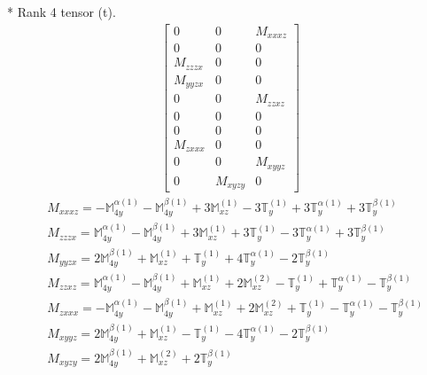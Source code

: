 \documentclass[fleqn,8pt,landscape]{jsarticle}
\begin{document}
* Rank 4 tensor (t).
\begin{align*}
\begin{bmatrix} 0 & 0 & M_{xxxz} \\ 0 & 0 & 0 \\ M_{zzzx} & 0 & 0 \\ M_{yyzx} & 0 & 0 \\ 0 & 0 & M_{zzxz} \\ 0 & 0 & 0 \\ 0 & 0 & 0 \\ M_{zxxx} & 0 & 0 \\ 0 & 0 & M_{xyyz} \\ 0 & M_{xyzy} & 0 \end{bmatrix}
\end{align*}
\begin{align*}
& M_{xxxz} = - \mathbb{M}_{4y}^{\alpha(1)} - \mathbb{M}_{4y}^{\beta(1)} + 3 \mathbb{M}_{xz}^{(1)} - 3 \mathbb{T}_{y}^{(1)} + 3 \mathbb{T}_{y}^{\alpha(1)} + 3 \mathbb{T}_{y}^{\beta(1)} \\
& M_{zzzx} = \mathbb{M}_{4y}^{\alpha(1)} - \mathbb{M}_{4y}^{\beta(1)} + 3 \mathbb{M}_{xz}^{(1)} + 3 \mathbb{T}_{y}^{(1)} - 3 \mathbb{T}_{y}^{\alpha(1)} + 3 \mathbb{T}_{y}^{\beta(1)} \\
& M_{yyzx} = 2 \mathbb{M}_{4y}^{\beta(1)} + \mathbb{M}_{xz}^{(1)} + \mathbb{T}_{y}^{(1)} + 4 \mathbb{T}_{y}^{\alpha(1)} - 2 \mathbb{T}_{y}^{\beta(1)} \\
& M_{zzxz} = \mathbb{M}_{4y}^{\alpha(1)} - \mathbb{M}_{4y}^{\beta(1)} + \mathbb{M}_{xz}^{(1)} + 2 \mathbb{M}_{xz}^{(2)} - \mathbb{T}_{y}^{(1)} + \mathbb{T}_{y}^{\alpha(1)} - \mathbb{T}_{y}^{\beta(1)} \\
& M_{zxxx} = - \mathbb{M}_{4y}^{\alpha(1)} - \mathbb{M}_{4y}^{\beta(1)} + \mathbb{M}_{xz}^{(1)} + 2 \mathbb{M}_{xz}^{(2)} + \mathbb{T}_{y}^{(1)} - \mathbb{T}_{y}^{\alpha(1)} - \mathbb{T}_{y}^{\beta(1)} \\
& M_{xyyz} = 2 \mathbb{M}_{4y}^{\beta(1)} + \mathbb{M}_{xz}^{(1)} - \mathbb{T}_{y}^{(1)} - 4 \mathbb{T}_{y}^{\alpha(1)} - 2 \mathbb{T}_{y}^{\beta(1)} \\
& M_{xyzy} = 2 \mathbb{M}_{4y}^{\beta(1)} + \mathbb{M}_{xz}^{(2)} + 2 \mathbb{T}_{y}^{\beta(1)}
\end{align*}
\end{document}
